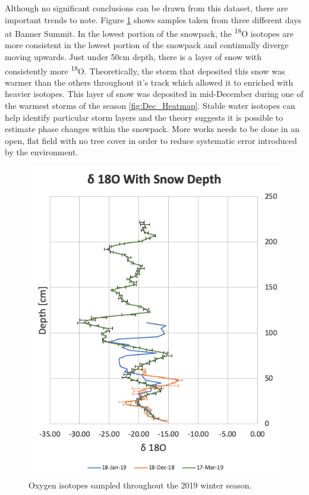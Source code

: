 Although no significant conclusions can be drawn from this dataset, there are important trends to note. Figure \ref{fig:WY2019_Isotopes} shows samples taken from three different days at Banner Summit. In the lowest portion of the snowpack, the \textsuperscript{18}O isotopes are more consistent in the lowest portion of the snowpack and continually diverge moving upwards. Just under 50cm depth, there is a layer of snow with consistently more \textsuperscript{18}O. Theoretically, the storm that deposited this snow was warmer than the others throughout it's track which allowed it to enriched with heavier isotopes. This layer of snow was deposited in mid-December during one of the warmest storms of the season \ref{fig:Dec_Heatmap}. Stable water isotopes can help identify particular storm layers and the theory suggests it is possible to estimate phase changes within the snowpack. More works needs to be done in an open, flat field with no tree cover in order to reduce systematic error introduced by the environment. 

\begin{figure}
    \centering
    \includegraphics[width=0.8\linewidth]{figures/Isotopes/Season_Isotopes.png}
    \caption{Oxygen isotopes sampled throughout the 2019 winter season.}
    \label{fig:WY2019_Isotopes}
 \end{figure}

